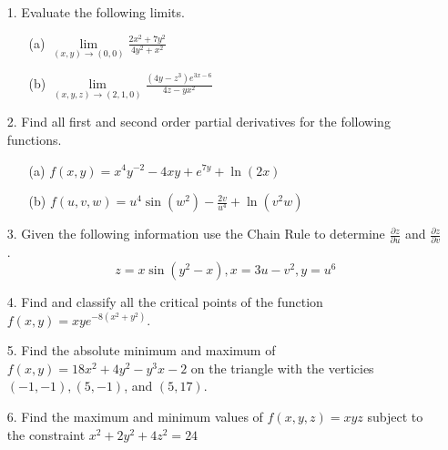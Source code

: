 \documentclass[12pt, amssymb, one column]{article}
\begin{document}
\begin{itemize}
	\item[1.] Evaluate the following limits.
		\begin{itemize}
			\item[(a)] $\lim\limits_{(x,y) \to (0,0)} \frac{2x^2 + 7y^2}{4y^2+x^2}$
			\item[(b)] $\lim\limits_{(x,y,z) \to (2,1,0)} \frac{(4y-z^3)e^{3x-6}}{4z-yx^2}$
		\end{itemize}
	
	\item[2.] Find all first and second order partial derivatives for the following functions.
		\begin{itemize}
			\item[(a)]$f(x,y) = x^4y^{-2} -4xy+e^{7y} +\ln(2x)$
			\item[(b)]$f(u,v,w) = u^4 \sin (w^2) - \frac{2v}{u^4} + \ln(v^2w)$
		\end{itemize}
	
	\item[3.] Given the following information use the Chain Rule to determine $\frac{\partial z}{\partial u}$ and $\frac{\partial z}{\partial v}$.
	$$z=x\sin(y^2-x), x=3u-v^2, y=u^6$$
	
	\item[4.] Find and classify all the critical points of the function $f(x,y) = xye^{-8(x^2+y^2)}$.
	
	\item[5.] Find the absolute minimum and maximum of $f(x,y) = 18x^2 + 4y^2 -y^3x-2$ on the triangle with the verticies $(-1,-1),(5,-1)$, and $(5,17)$.
			
	\item[6.] Find the maximum and minimum values of $f(x,y,z) = xyz$ subject to the constraint $x^2 + 2y^2+4z^2 = 24$
\end{itemize}
\end{document}
